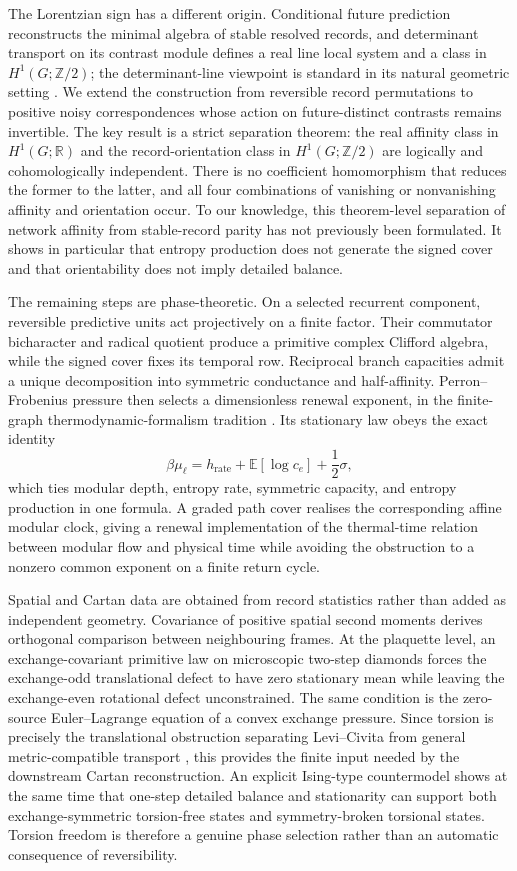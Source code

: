 \documentclass[11pt]{article}
\theoremstyle{definition}
\theoremstyle{remark}
\newcommand{\R}{\mathbb R}
\newcommand{\Ztwo}{\mathbb Z/2}
\begin{document}
The Lorentzian sign has a different origin.  Conditional future prediction
reconstructs the minimal algebra of stable resolved records, and determinant
transport on its contrast module defines a real line local system and a class
in $H^1(G;\Ztwo)$; the determinant-line viewpoint is standard in its natural
geometric setting \cite{ZingerDeterminant2016}.  We extend the construction
from reversible record permutations to positive noisy correspondences whose
action on future-distinct contrasts remains invertible.  The key result is a
strict separation theorem: the real affinity class in $H^1(G;\R)$ and the
record-orientation class in $H^1(G;\Ztwo)$ are logically and cohomologically
independent.  There is no coefficient homomorphism that reduces the former to
the latter, and all four combinations of vanishing or nonvanishing affinity
and orientation occur.  To our knowledge, this theorem-level separation of
network affinity from stable-record parity has not previously been formulated.
It shows in particular that entropy production does not generate the signed
cover and that orientability does not imply detailed balance.

The remaining steps are phase-theoretic.  On a selected recurrent component,
reversible predictive units act projectively on a finite factor.  Their
commutator bicharacter and radical quotient produce a primitive complex
Clifford algebra, while the signed cover fixes its temporal row.  Reciprocal
branch capacities admit a unique decomposition into symmetric conductance and
half-affinity.  Perron--Frobenius pressure then selects a dimensionless renewal
exponent, in the finite-graph thermodynamic-formalism tradition
\cite{Bowen1975,Ruelle2004,ParryPollicott1990}.  Its stationary law obeys the
exact identity
\[
  \beta\mu_\ell
  =h_{\mathrm{rate}}+\mathbb E[\log c_e]+\frac12\sigma,
\]
which ties modular depth, entropy rate, symmetric capacity, and entropy
production in one formula.  A graded path cover realises the corresponding
affine modular clock, giving a renewal implementation of the thermal-time
relation between modular flow and physical time \cite{ConnesRovelli1994} while
avoiding the obstruction to a nonzero common exponent on a finite return
cycle.

Spatial and Cartan data are obtained from record statistics rather than added
as independent geometry.  Covariance of positive spatial second moments
derives orthogonal comparison between neighbouring frames.  At the
plaquette level, an exchange-covariant primitive law on microscopic two-step
diamonds forces the exchange-odd translational defect to have zero stationary
mean while leaving the exchange-even rotational defect unconstrained.  The
same condition is the zero-source Euler--Lagrange equation of a convex
exchange pressure.  Since torsion is precisely the translational obstruction
separating Levi--Civita from general metric-compatible transport
\cite{Hehl1976}, this provides the finite input needed by the downstream
Cartan reconstruction.  An explicit Ising-type countermodel shows at the same
time that one-step detailed balance and stationarity can support both
exchange-symmetric torsion-free states and symmetry-broken torsional states.
Torsion freedom is therefore a genuine phase selection rather than an
automatic consequence of reversibility.
\end{document}
